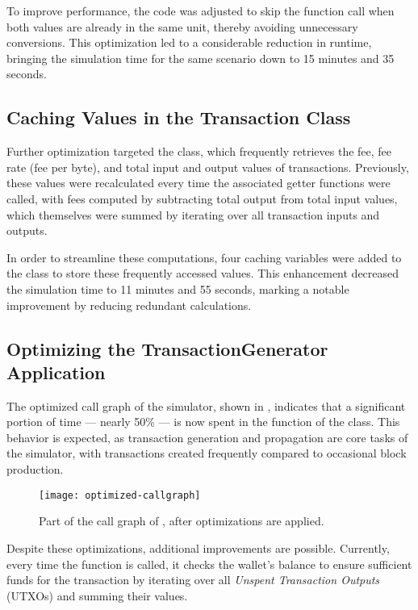 To improve performance, the code was adjusted to skip the 
function call when both values are already in the same unit, thereby avoiding
unnecessary conversions. This optimization led to a considerable reduction in
runtime, bringing the simulation time for the same scenario down to 15 minutes
and 35 seconds.

\subsection{Caching Values in the Transaction
Class}\label{subsec:caching-values}

Further optimization targeted the  class, which frequently
retrieves the fee, fee rate (fee per byte), and total input and output values
of transactions. Previously, these values were recalculated every time the
associated getter functions were called, with fees computed by subtracting
total output from total input values, which themselves were summed by iterating
over all transaction inputs and outputs.

In order to streamline these computations, four caching variables were added to
the  class to store these frequently accessed values. This
enhancement decreased the simulation time to 11 minutes and 55 seconds, marking
a notable improvement by reducing redundant calculations.

\subsection{Optimizing the TransactionGenerator Application}\label{subsec:optimizing-txgen}

The optimized call graph of the simulator, shown in
, indicates that a significant portion of time
--- nearly 50\% --- is now spent in the  function of
the  class. This behavior is expected, as
transaction generation and propagation are core tasks of the simulator, with
transactions created frequently compared to occasional block production.

\begin{figure}[tbhp]
	\centering
	\texttt{[image: optimized-callgraph]}
	\caption{Part of the call graph of \iblock{}, after optimizations are
	applied.}\label{fig:callgrind-optimized}
\end{figure}

Despite these optimizations, additional improvements are possible. Currently,
every time the  function is called, it checks the
wallet's balance to ensure sufficient funds for the transaction by iterating
over all \textit{Unspent Transaction Outputs} (UTXOs) and summing their values.

